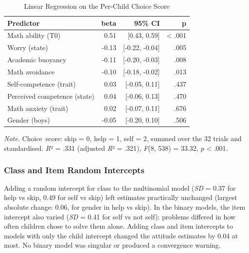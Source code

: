 \documentclass[
  man,
  floatsintext,
  longtable,
  nolmodern,
  notxfonts,
  notimes,
  colorlinks=true,linkcolor=blue,citecolor=blue,urlcolor=blue]{apa7}
\makeatletter
\renewenvironment{longtable}[1][]%
    {\par\vspace{24pt}\noindent\begin{tabular}}%
    {\bottomrule\end{tabular}\par\vspace{24pt}}%
\let\endhead\apa@gobblefoot}
\makeatother
\begin{document}
\begin{table}

{\caption{{Linear Regression on the Per-Child Choice
Score}{\label{tbl-lm}}}
\vspace{-20pt}}

\begin{longtable}[]{@{}lrrr@{}}
\toprule\noalign{}
Predictor & beta & 95\% CI & p \\
\midrule\noalign{}
\endhead
\bottomrule\noalign{}
\endlastfoot
Math ability (T0) & 0.51 & {[}0.43, 0.59{]} & \textless{} .001 \\
Worry (state) & -0.13 & {[}-0.22, -0.04{]} & .005 \\
Academic buoyancy & -0.11 & {[}-0.20, -0.03{]} & .008 \\
Math avoidance & -0.10 & {[}-0.18, -0.02{]} & .013 \\
Self-competence (trait) & 0.03 & {[}-0.05, 0.11{]} & .437 \\
Perceived competence (state) & 0.04 & {[}-0.06, 0.13{]} & .470 \\
Math anxiety (trait) & 0.02 & {[}-0.07, 0.11{]} & .676 \\
Gender (boys) & -0.05 & {[}-0.20, 0.10{]} & .506 \\
\end{longtable}

\vspace{-20pt}
\noindent \emph{Note.} Choice~score: skip = 0, help = 1, self = 2,
summed over the 32 trials and standardised. \emph{R}² = .331 (adjusted
\emph{R}² = .321), \emph{F}(8, 538) = 33.32, \emph{p} \textless{} .001.

\end{table}

\subsubsection{Class and Item Random
Intercepts}\label{class-and-item-random-intercepts}

Adding a random intercept for class to the multinomial model (\emph{SD}
= 0.37 for help vs skip, 0.49 for self vs skip) left estimates
practically unchanged (largest absolute change: 0.06, for gender in help
vs skip). In the binary models, the item intercept also varied
(\emph{SD} = 0.41 for self vs not self): problems differed in how often
children chose to solve them alone. Adding class and item intercepts to
models with only the child intercept changed the attitude estimates by
0.04 at most. No binary model was singular or produced a convergence
warning.
\end{document}
